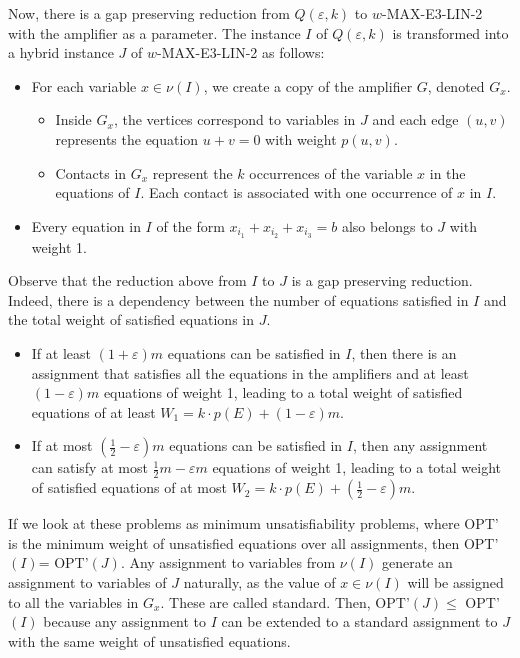 \documentclass[12pt]{article}
\begin{document}
Now, there is a gap preserving reduction from $Q(\varepsilon, k)$ to $w$-MAX-E3-LIN-2 with the amplifier as a parameter. 
The instance $I$ of $Q(\varepsilon, k)$ is transformed into a hybrid instance $J$ of $w$-MAX-E3-LIN-2 as follows:
\begin{itemize}
    \item For each variable $x \in \nu(I)$, we create a copy of the amplifier $G$, denoted $G_x$. 
        \begin{itemize}
            \item Inside $G_x$, the vertices correspond to variables in $J$ and each edge $(u,v)$ represents the equation $u + v = 0$ with weight $p(u,v)$.
            \item Contacts in $G_x$ represent the $k$ occurrences of the variable $x$ in the equations of $I$. Each contact is associated with one occurrence of $x$ in $I$.
        \end{itemize}
    \item Every equation in $I$ of the form $x_{i_1} + x_{i_2} + x_{i_3} = b$ also belongs to $J$ with weight 1. 
\end{itemize}
Observe that the reduction above from $I$ to $J$ is a gap preserving reduction. Indeed, there is a dependency between the number of equations satisfied in $I$ and the total weight of satisfied equations in $J$.
\begin{itemize}
    \item If at least $(1 + \varepsilon)m$ equations can be satisfied in $I$, then there is an assignment that satisfies all the equations in the amplifiers and at least $(1 - \varepsilon)m$ equations of weight 1, leading to a total weight of satisfied equations of at least $W_1 = k \cdot p(E) + (1 - \varepsilon)m$.
    \item If at most $(\frac{1}{2} - \varepsilon)m$ equations can be satisfied in $I$, then any assignment can satisfy at most $\frac{1}{2}m - \varepsilon m$ equations of weight 1, leading to a total weight of satisfied equations of at most $W_2 = k \cdot p(E) + (\frac{1}{2} - \varepsilon)m$.
\end{itemize}
If we look at these problems as minimum unsatisfiability problems, where OPT' is the minimum
 weight of unsatisfied equations over all assignments, then 
OPT'$(I)$= OPT'$(J)$.
Any assignment to variables from $\nu(I)$ generate an assignment to variables of $J$ naturally, as the value of $x\in \nu(I)$ will be assigned to all the variables in $G_x$. These are called standard. 
Then, OPT'$(J)\leq$ OPT'$(I)$ because any assignment to $I$ can be extended to a standard assignment to $J$ with the same weight of unsatisfied equations.
\end{document}
